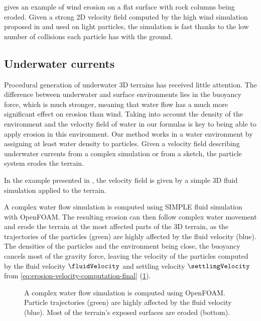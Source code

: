  gives an example of wind erosion on a flat surface with rock columns being eroded. Given a strong 2D velocity field computed by the high wind simulation proposed in \cite{Paris2019b} and used on light particles, the simulation is fast thanks to the low number of collisions each particle has with the ground. 

\subsection{Underwater currents}

Procedural generation of underwater 3D terrains has received little attention. The difference between underwater and surface environments lies in the buoyancy force, which is much stronger, meaning that water flow has a much more significant effect on erosion than wind. Taking into account the density of the environment and the velocity field of water in our formulas is key to being able to apply erosion in this environment.  
Our method works in a water environment by assigning at least water density to particles. Given a velocity field describing underwater currents from a complex simulation or from a sketch, the particle system erodes the terrain. 

In the example presented in , the velocity field is given by a simple 3D fluid simulation \cite{Stam1999} applied to the terrain.

A complex water flow simulation is computed using SIMPLE \cite{Caretto1973} fluid simulation with OpenFOAM. The resulting erosion can then follow complex water movement and erode the terrain at the most affected parts of the 3D terrain, as the trajectories of the particles (green) are highly affected by the fluid velocity (blue). The densities of the particles and the environment being close, the buoyancy cancels most of the gravity force, leaving the velocity of the particles computed by the fluid velocity $\fluidVelocity$ and settling velocity $\settlingVelocity$ from \eqref{eq:erosion-velocity-computation-final} (\cref{fig:erosion-underwater_result}).

\begin{figure}
    \caption{A complex water flow simulation is computed using OpenFOAM. Particle trajectories (green) are highly affected by the fluid velocity (blue). Most of the terrain’s exposed surfaces are eroded (bottom).}
    \label{fig:erosion-underwater_result}
\end{figure}



